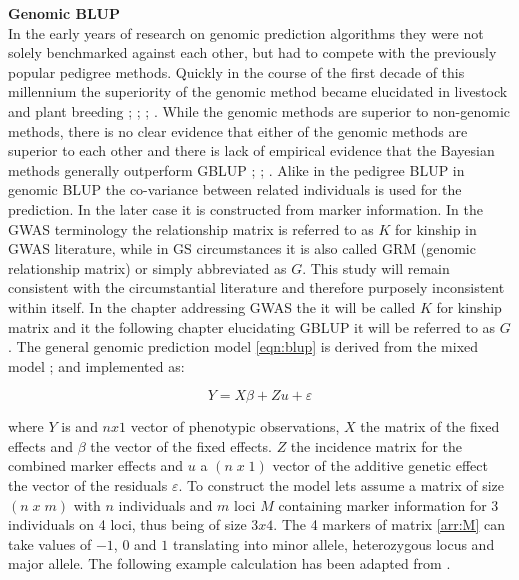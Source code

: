 \noindent
\textbf{Genomic BLUP} \\ In the early years of research on genomic prediction algorithms they were not
solely benchmarked against each other, but had to compete with the previously popular pedigree
methods. Quickly in the course of the first decade of this millennium the superiority of the genomic method
became elucidated in livestock and plant breeding \cite{habier2007impact}; \cite{vanraden2008efficient};
\cite{vanraden2008reliability}; \cite{harris2009genomic}. While the genomic methods are superior to
non-genomic methods, there is no clear evidence that either of the genomic methods are superior to each other
and there is lack of empirical evidence that the Bayesian methods generally outperform GBLUP
\cite{moser2009comparison} ; \cite{bernardo2010breeding}; \cite{azodi2019}. Alike in the pedigree BLUP in
genomic BLUP the co-variance between related individuals is used for the prediction. In the later case it is
constructed from marker information. In the GWAS terminology the relationship matrix is referred to as $K$ for
kinship in GWAS literature, while in GS circumstances it is also called GRM (genomic relationship matrix) or
simply abbreviated as $G$. This study will remain consistent with the circumstantial literature and therefore
purposely inconsistent within itself. In the chapter addressing GWAS the it will be called $K$ for kinship
matrix and it the following chapter elucidating GBLUP it will be referred to as $G$. The general genomic
prediction model \ref{eqn:blup} is derived from the mixed model \cite{henderson1975best};
\cite{vanraden2008efficient} and implemented as:

\begin{equation}
Y = X \beta + Zu + \varepsilon
 \label{eqn:blup}
\end{equation}

where $Y$ is and $nx1$ vector of phenotypic observations, $X$ the matrix of the fixed effects and $\beta$ the
vector of the fixed effects. $Z$ the incidence matrix for the combined marker effects and $u$ a $(n\; x\; 1)$ vector
of the additive genetic effect the vector of the residuals $\varepsilon$. To construct the model lets assume
a matrix of size $(n\; x\; m)$ with $n$ individuals and $m$ loci $M$ containing marker information for 3
individuals on 4 loci, thus being of size $3x4$. The 4 markers of matrix \ref{arr:M} can take values of $-1$,
$0$ and $1$ translating into minor allele, heterozygous locus and major allele. The following example
calculation has been adapted from \cite{isik2013}.

